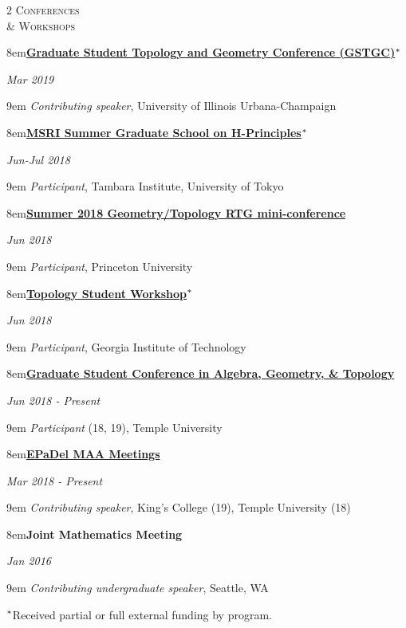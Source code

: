 \documentclass[11pt]{article}
\newcommand{\itemregind}[1]{\begin{addmargin}[1.75em]{9em} #1 \end{addmargin}}
\newcommand{\itemregdate}[2]{\begin{addmargin}[0em]{8em}#1\end{addmargin}\vspace{-1.5em}\hfill\textit{#2}\\ \vspace{.25em}}
\begin{document}
\begin{multicols}{2}
	\textsc{Conferences \\ \& Workshops}
	
	\columnbreak
	
	\itemregdate{\textbf{\href{https://faculty.math.illinois.edu/~hquan4/GSTGC2019/index.html}{Graduate Student Topology and Geometry Conference (GSTGC)}}$\null^*$}{Mar 2019}
		\itemregind{\textit{Contributing speaker}, University of Illinois Urbana-Champaign}
		\vspace{.35em}
	
	\itemregdate{\textbf{\href{http://www.msri.org/web/msri/scientific/workshops/summer-graduate-school}{MSRI Summer Graduate School on H-Principles}}$\null^*$}{Jun-Jul 2018}
		\itemregind{\textit{Participant}, Tambara Institute, University of Tokyo}
		\vspace{.35em}
		
	\itemregdate{\textbf{\href{https://web.math.princeton.edu/~petero/RTG/MiniConf1.html}{Summer 2018 Geometry/Topology RTG mini-conference}}}{Jun 2018}
		\itemregind{\textit{Participant}, Princeton University}
		\vspace{.35em}
		
	\itemregdate{\textbf{\href{http://people.math.gatech.edu/~dmargalit7/tsw18/index.shtml}{Topology Student Workshop}}$\null^*$}{Jun 2018}
		\itemregind{\textit{Participant}, Georgia Institute of Technology}
		\vspace{.35em}
		
	\itemregdate{\textbf{\href{https://math.temple.edu/events/conferences/gscagt/}{Graduate Student Conference in Algebra, Geometry, \& Topology}}}{Jun 2018 - Present}
			\itemregind{\textit{Participant} (18, 19), Temple University}
			\vspace{.35em}
			
	\itemregdate{\textbf{\href{http://sections.maa.org/epadel/}{EPaDel MAA Meetings}}}{Mar 2018 - Present}
			\itemregind{\textit{Contributing speaker}, King's College (19), Temple University (18)}
			\vspace{.35em}
			
	\itemregdate{\textbf{Joint Mathematics Meeting}}{Jan 2016}
			\itemregind{\textit{Contributing undergraduate speaker}, Seattle, WA}
			\vspace{.5em}
			
			\hspace{-0em}$\null^*${\footnotesize{Received partial or full external funding by program.}}
\end{multicols}
\vspace{-.5em}
\end{document}

